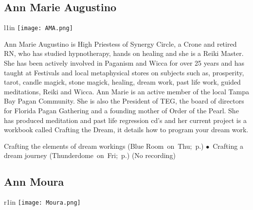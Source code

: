\endgroup

\vspace{6pt}
\subsection{Ann Marie Augustino} 

\begingroup
 \begin{wrapfigure}{l}{1in}
  \texttt{[image: AMA.png]} %
  \end{wrapfigure}

{ Ann Marie Augustino is High Priestess of Synergy Circle, a Crone and retired RN, who has studied hypnotherapy, hands on healing and she is a Reiki Master. She has been actively involved in Paganism and Wicca for over 25 years and has taught at Festivals and local metaphysical stores on subjects such as, prosperity, tarot, candle magick, stone magick, healing, dream work, past life work, guided meditations, Reiki and Wicca. Ann Marie is an active member of the local Tampa Bay Pagan Community.  She is also the President of TEG, the board of directors for Florida Pagan Gathering and a founding mother of Order of the Pearl. She has produced meditation and past life regression cd's and her current project is a workbook called Crafting the Dream, it details how to program your dream work. 

} \hspace{2em} {\footnotesize Crafting the elements of dream workings (Blue Room~on~Thu;~p.\pageref{Thu-AMA2}) $\bullet$~Crafting a dream journey (Thunderdome~on~Fri;~p.\pageref{Fri-AMA1})}
 {\small (No recording)} 


\endgroup

\vspace{6pt}
\subsection{Ann Moura} 

\begingroup
 \begin{wrapfigure}{r}{1in}
  \texttt{[image: Moura.png]} %
  \end{wrapfigure}


